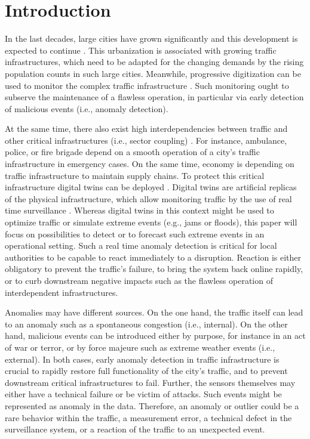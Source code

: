 \documentclass[conference]{IEEEtran}
\begin{document}

\section{Introduction}

In the last decades, large cities have grown significantly and this development is expected to continue \cite{UN2014Urbanization}. This urbanization is associated with growing traffic infrastructures, which need to be adapted for the changing demands by the rising population counts in such large cities. Meanwhile, progressive digitization can be used to monitor the complex traffic infrastructure \cite{mohammadi2017}. Such monitoring ought to subserve the maintenance of a flawless operation, in particular via early detection of malicious events (i.e., anomaly detection).

At the same time, there also exist high interdependencies between traffic and other critical infrastructures (i.e., sector coupling) \cite{ouyang2014}. For instance, ambulance, police, or fire brigade depend on a smooth operation of a city's traffic infrastructure in emergency cases. On the same time, economy is depending on traffic infrastructure to maintain supply chains. To protect this critical infrastructure digital twins can be deployed \cite{ouyang2014}. Digital twins are artificial replicas of the physical infrastructure, which allow monitoring traffic by the use of real time surveillance \cite{mohammadi2017}. Whereas digital twins in this context might be used to optimize traffic or simulate extreme events (e.g., jams or floods), this paper will focus on possibilities to detect or to forecast such extreme events in an operational setting. Such a real time anomaly detection is critical for local authorities to be capable to react immediately to a disruption. Reaction is either obligatory to prevent the traffic's failure, to bring the system back online rapidly, or to curb downstream negative impacts such as the flawless operation of interdependent infrastructures.

Anomalies may have different sources. On the one hand, the traffic itself can lead to an anomaly such as a spontaneous congestion (i.e., internal). On the other hand, malicious events can be introduced either by purpose, for instance in an act of war or terror, or by force majeure such as extreme weather events (i.e., external).
In both cases, early anomaly detection in traffic infrastructure is crucial to rapidly restore full functionality of the city's traffic, and to prevent downstream critical infrastructures to fail. 
Further, the sensors themselves may either have a technical failure or be victim of attacks. Such events might be represented as anomaly in the data. Therefore, an anomaly or outlier could be a rare behavior within the traffic, a measurement error, a technical defect in the surveillance system, or a reaction of the traffic to an unexpected event.
\end{document}
